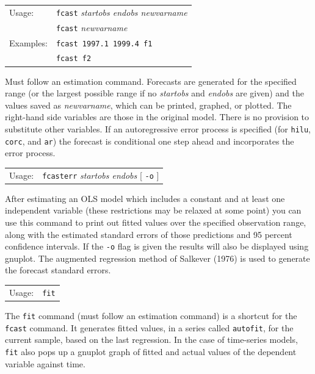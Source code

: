 \documentclass{article}
\begin{document}
{

\begin{tabular}{ll}
Usage: & \texttt{fcast} \textit{startobs endobs newvarname}  \\
       & \texttt{fcast} \textit{newvarname}\\
Examples: & \texttt{fcast 1997.1 1999.4 f1} \\
          & \texttt{fcast f2}
\end{tabular}

Must follow an estimation command.  Forecasts are generated
for the specified range (or the largest possible range if no
\textit{startobs} and \textit{endobs} are given) and the values saved
as \textit{newvarname}, which can be printed, graphed, or plotted.
The right-hand side variables are those in the original model.  There
is no provision to substitute other variables.  If an autoregressive
error process is specified (for \texttt{hilu}, \texttt{corc}, and
\texttt{ar}) the forecast is conditional one step ahead and
incorporates the error process.


\begin{tabular}{ll}
Usage:  &        \texttt{fcasterr} \textit{startobs endobs} [ \texttt{-o} ]
\end{tabular}

After estimating an OLS model which includes a constant and at least
one independent variable (these restrictions may be relaxed at some
point) you can use this command to print out fitted values over the
specified observation range, along with the estimated standard errors
of those predictions and 95 percent confidence intervals.  If the
\texttt{-o} flag is given the results will also be displayed using
gnuplot.  The augmented regression method of Salkever (1976) is used
to generate the forecast standard errors.


\begin{tabular}{ll}
Usage:  &  \texttt{fit}
\end{tabular}

The \texttt{fit} command (must follow an estimation command) is a
shortcut for the \texttt{fcast} command.  It generates fitted values, in a
series called \texttt{autofit}, for the current sample, based on the last
regression.  In the case of time-series models, \texttt{fit} also pops up a
gnuplot graph of fitted and actual values of the dependent variable
against time.

}
\end{document}
